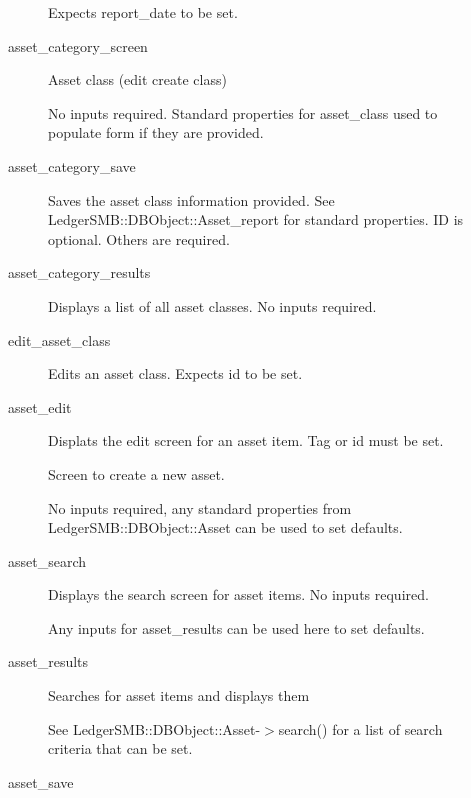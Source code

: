 \begin{description}
\begin{description}
Expects report\_date to be set.


\item[{asset\_category\_screen}] \mbox{}

Asset class (edit create class)



No inputs required.  Standard properties for asset\_class used to populate form
if they are provided.


\item[{asset\_category\_save}] \mbox{}

Saves the asset class information provided.  
See LedgerSMB::DBObject::Asset\_report for standard properties.  ID is optional.
Others are required.


\item[{asset\_category\_results}] \mbox{}

Displays a list of all asset classes.  No inputs required.


\item[{edit\_asset\_class}] \mbox{}

Edits an asset class.  Expects id to be set.


\item[{asset\_edit}] \mbox{}

Displats the edit screen for an asset item.  Tag or id must be set.


\item[{}] \mbox{}

Screen to create a new asset.



No inputs required, any standard properties from LedgerSMB::DBObject::Asset
can be used to set defaults.


\item[{asset\_search}] \mbox{}

Displays the search screen for asset items.  No inputs required.



Any inputs for asset\_results can be used here to set defaults.


\item[{asset\_results}] \mbox{}

Searches for asset items and displays them



See LedgerSMB::DBObject::Asset-$>$search() for a list of search criteria that can
be set.


\item[{asset\_save}] \mbox{}


\end{description}
\end{description}

